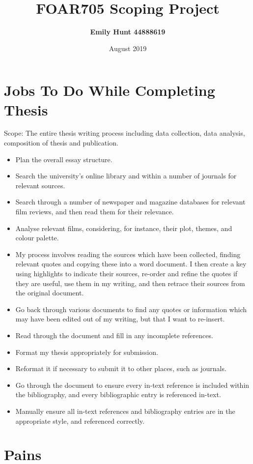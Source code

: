 \documentclass{article}
\title{\textbf{FOAR705 Scoping Project}}
\author{\textbf{Emily Hunt 44888619}}
\date{August 2019}
\begin{document}
\maketitle

\section*{Jobs To Do While Completing Thesis}
Scope: The entire thesis writing process including data collection, data analysis, composition of thesis and publication.
\begin{itemize}
    \item Plan the overall essay structure.
    \item Search the university's online library and within a number of journals for relevant sources.
    \item Search through a number of newspaper and magazine databases for relevant film reviews, and then read them for their relevance.
    \item Analyse relevant films, considering, for instance, their plot, themes, and colour palette.
    \item My process involves reading the sources which have been collected, finding relevant quotes and copying these into a word document. I then create a key using highlights to indicate their sources, re-order and refine the quotes if they are useful, use them in my writing, and then retrace their sources from the original document.
    \item Go back through various documents to find any quotes or information which may have been edited out of my writing, but that I want to re-insert.
    \item Read through the document and fill in any incomplete references.
    \item Format my thesis appropriately for submission.
    \item Reformat it if necessary to submit it to other places, such as journals.
    \item Go through the document to ensure every in-text reference is included within the bibliography, and every bibliographic entry is referenced in-text.
    \item Manually ensure all in-text references and bibliography entries are in the appropriate style, and referenced correctly.
\end{itemize}

\pagebreak

\section*{Pains}
\end{document}
